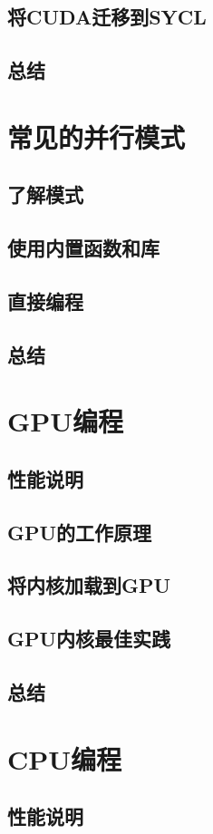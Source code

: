 \documentclass[11pt,a4paper,UTF8]{ctexart}
\begin{document}
		\subsection{将CUDA迁移到SYCL}
		\subsection{总结}
	\section{常见的并行模式}
		\subsection{了解模式}
		\subsection{使用内置函数和库}
		\subsection{直接编程}
		\subsection{总结}
	\section{GPU编程}
		\subsection{性能说明}
		\subsection{GPU的工作原理}
		\subsection{将内核加载到GPU}
		\subsection{GPU内核最佳实践}
		\subsection{总结}
	\section{CPU编程}
		\subsection{性能说明}
\end{document}
